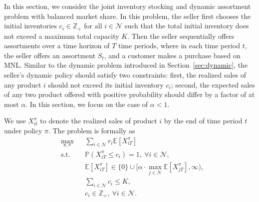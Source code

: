 \documentclass[mnsc,non-blindrev]{informs3}
\theoremstyle{definition}
\begin{document}
\begin{appendices}{\Large{}}
{In this section, we consider the joint inventory stocking and dynamic assortment problem with balanced market share. In this problem, the seller first chooses the initial inventories $c_i\in\mathbb{Z}_+$ for all $i\in\mathcal{N}$ such that the total initial inventory does not exceed a maximum total capacity $K$. Then the seller sequentially offers assortments over a time horizon of $T$ time periods, where in each time period $t$, the seller offers an assortment $S_t$, and a customer makes a purchase based on MNL. Similar to the dynamic problem introduced in Section~\ref{sec:dynamic}, the seller's dynamic policy should satisfy two constraints: first, the realized sales of any product $i$ should not exceed its initial inventory $c_i$; second, the expected sales of any two product offered with positive probability should differ by a factor of at most $\alpha$. In this section, we focus on the case of $\alpha<1$.

We use $X_{it}^\pi$ to denote the realized sales of product $i$ by the end of time period $t$ under policy $\pi$. The problem is formally as
\begin{equation}\label{prob:joint_inventory_assortment}
\begin{aligned}
&\max_{\bm{c},\pi}&&\sum_{i\in\mathcal{N}}r_i\mathbb{E}[X_{iT}^\pi]\\
&\text{s.t.}&&\mathbb{P}(X_{iT}^\pi\leq c_i)=1,\ \forall i\in\mathcal{N},\\
&&&\mathbb{E}[X_{iT}^\pi]\in\{0\}\cup\Big[\alpha\cdot \max_{j\in\mathcal{N}}\mathbb{E}[X_{jT}^\pi],\infty\Big),\\
&&&\sum_{i\in\mathcal{N}}c_i\leq K,\\
&&&c_i\in\mathbb{Z}_+,\ \forall i\in\mathcal{N}.
\end{aligned}
\end{equation}

}
\end{appendices}
\end{document}
